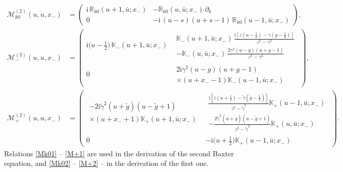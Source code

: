 \documentclass[a4paper,11pt]{article}
\renewcommand{\imath}{\mathrm{i}}
\numberwithin{equation}{section}
\begin{document}
\begin{align}
	\label{Mk02}
	\mathcal{M}^{(2)}_{k0}(u,u,x_-) & =
	\begin{pmatrix}
		\imath\,\mathbb{R}_{k0}(u+1,\bar{u};x_-) &
		-\mathbb{R}_{k0}(u,\bar{u};x_-)\,\partial_k \\
		0 &
		-\imath\,(u-s)(u+s-1)\,\mathbb{R}_{k0}(u-1,\bar{u};x_-)
	\end{pmatrix} , \\
	\label{M-2}
	\mathcal{M}^{(2)}_-(u,u,x_-) & =
	\left(
	\begin{array}{c|c}
		\imath\bigl(u-\frac{1}{2}\bigr)\,\mathbb{K}_-(u+1,\bar{u};x_-) &
		\begin{array}{l}
			\mathbb{K}_-(u+1,\bar{u};x_-)\,\frac{\imath[z(u-\frac{1}{2})-\gamma(g-\frac{1}{2})]}{z^2-\gamma^2} \\
			-\mathbb{K}_-(u,\bar{u};x_-)\,\frac{2\gamma^2(u-g)(u+g-1)}{z^2-\gamma^2}
		\end{array} \\[12pt]
		\hline
		0 &
		\begin{array}{l}
			2\imath\gamma^2(u-g)(u+g-1) \\
			\times (u+x_--1)\mathbb{K}_-(u-1,\bar{u};x_-)
		\end{array}
	\end{array}
	\right) \!, \\
	\label{M+2}
	\mathcal{M}^{(2)}_+(u,u,x_-) & =
	\left(
	\begin{array}{c|c}
		\begin{array}{l}
			-2\imath\tilde{\gamma}^2(u+\tilde{g})(u-\tilde{g}+1) \\
			\times (u+x_-+1) \mathbb{K}_+(u+1,\bar{u};x_-)
		\end{array}
		&
		\begin{array}{l}
			\frac{\imath[z(u+\frac{1}{2})-\tilde{\gamma}(\tilde{g}-\frac{1}{2})]}{z^2-\tilde{\gamma}^2}\mathbb{K}_+(u-1,\bar{u};x_-) \\
			-\frac{2\tilde{\gamma}^2(u+\tilde{g})(u-\tilde{g}+1)}{z^2-\tilde{\gamma}^2}\mathbb{K}_+(u,\bar{u};x_-) 
		\end{array} \\[12pt]
		\hline
		0 &
		-\imath\bigl(u+\frac{1}{2}\bigr)\mathbb{K}_+(u-1,\bar{u};x_-)
	\end{array}
	\right) \!.
\end{align}
Relations \eqref{Mk01} -- \eqref{M+1} are used in the derivation of the second Baxter equation, and \eqref{Mk02} -- \eqref{M+2} -- in the derivation of the first one.
\end{document}
